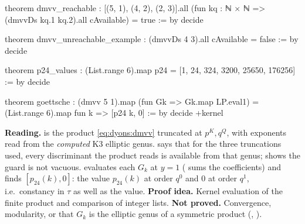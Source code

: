 \begin{leanbox}
\begin{leancode}
theorem dmvv_reachable :
    [(5, 1), (4, 2), (2, 3)].all
      (fun kq : ℕ × ℕ => (dmvvDs kq.1 kq.2).all cAvailable) = true := by decide

theorem dmvv_unreachable_example :
    (dmvvDs 4 3).all cAvailable = false := by decide

theorem p24_values :
    (List.range 6).map p24 = [1, 24, 324, 3200, 25650, 176256] := by decide

theorem goettsche :
    (dmvv 5 1).map (fun Gk => Gk.map LP.eval1) =
      (List.range 6).map fun k => [p24 k, 0] := by decide +kernel
\end{leancode}
\textbf{Reading.}  is the product \eqref{eq:dyons:dmvv} truncated at $p^K,q^Q$,
with exponents read from the \emph{computed} K3 elliptic genus.  says
that for the three truncations used, every discriminant the product reads is available from
that genus;  shows the guard is not vacuous. 
evaluates each $G_k$ at $y=1$ ( sums the coefficients) and finds
$[p_{24}(k),0]$: the value $p_{24}(k)$ at order $q^0$ and $0$ at order $q^1$, i.e.\ constancy
in $\tau$ as well as the value. \textbf{Proof idea.} Kernel evaluation of the finite product
and comparison of integer lists. \textbf{Not proved.} Convergence, modularity, or that $G_k$ is
the elliptic genus of a symmetric product (\TL, ).
\end{leanbox}

